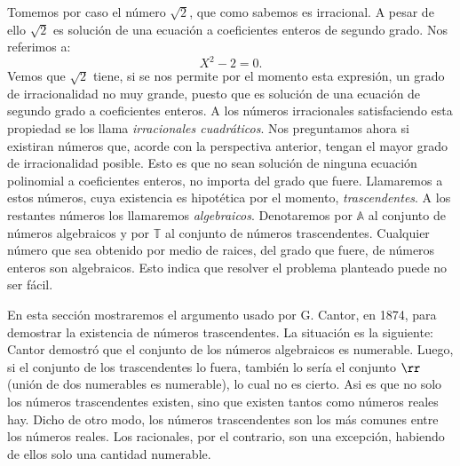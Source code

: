Tomemos por caso el
número $\sqrt{2}$, que como sabemos es irracional. A pesar de
ello $\sqrt{2}$ es solución de una ecuación a coeficientes
enteros de  segundo grado. Nos referimos a:
\[X^2-2=0.\]
Vemos que $\sqrt{2}$ tiene, si se nos permite por el momento esta
expresión, un grado de irracionalidad no muy grande, puesto
que es solución de una ecuación de segundo grado a
coeficientes enteros. A los números irracionales satisfaciendo esta propiedad se los llama  \emph{irracionales cuadráticos}.
Nos preguntamos ahora si existiran números que, acorde con la perspectiva anterior, tengan el mayor grado
de irracionalidad  posible. Esto es que no sean solución de
ninguna ecuación polinomial a coeficientes enteros, no importa
del grado que fuere. Llamaremos a estos números, cuya existencia
es hipotética por el momento, \emph{trascendentes}. A los
restantes números los llamaremos  \emph{algebraicos}. Denotaremos
por $\mathbb{A}$ al conjunto de números algebraicos y por
$\mathbb{T}$ al conjunto de números trascendentes. Cualquier
número que sea obtenido por medio de raices, del grado que
fuere, de números enteros son algebraicos. Esto indica que
resolver el problema planteado puede no ser fácil.


En esta sección mostraremos el argumento usado por G. Cantor, en
1874, para demostrar la existencia de números trascendentes. La
situación es la siguiente: Cantor demostró que el conjunto de
los números algebraicos es numerable. Luego, si el conjunto de
los trascendentes lo fuera, también lo sería el conjunto
$\rr$ (unión de dos numerables es numerable), lo cual no es
cierto. Asi es que no solo los números trascendentes existen,
sino que existen tantos como números reales hay. Dicho de otro
modo, los números trascendentes son los más comunes entre los
números reales. Los racionales, por el contrario, son una
excepción, habiendo de ellos solo una cantidad numerable.


